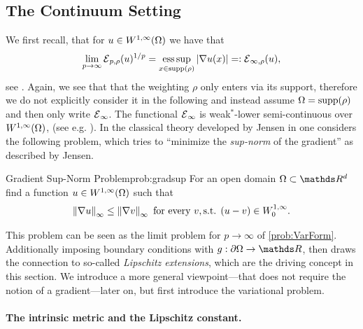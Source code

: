 \subsection{The Continuum Setting}\label{sec:LipExtCont}
%
%
We first recall, that for 
$u\in W^{1,\infty}(\Omega)$ we have that
%
\begin{align*}
\lim_{p\to\infty} \mathcal{E}{}_{p,\rho}(u)^{1/p} = \operatorname*{ess\,sup}_{x\in\mathrm{supp}(\rho)} \left|\nabla u(x)\right| =: \mathcal{E}{}_{\infty,\rho}(u),
\end{align*}
%
see \cite{jensen1993uniqueness}. Again, we see that that the weighting $\rho$ only enters via its support, therefore we do not explicitly consider it in the following and instead assume $\Omega=\mathrm{supp}(\rho)$ and then only write $\mathcal{E}{}_{\infty}$. The functional $\mathcal{E}{}_\infty$ is weak$^*$-lower semi-continuous over $W^{1,\infty}(\Omega)$, (see e.g. \cite[Thm. 2.6]{barron2001lower}). In the classical theory developed by Jensen in \cite{jensen1993uniqueness} one considers the following problem, which tries to \enquote{minimize the \emph{sup-norm} of the gradient} as described by Jensen.
%
\begin{problem}{Gradient Sup-Norm Problem}{prob:gradsup}
For an open domain $\domain\subset\R^d$ find a function $u\in W^{1,\infty}(\Omega)$ such that
%
\begin{align*}
\left\|\nabla u\right\|_\infty \leq \left\|\nabla v\right\|_\infty \text{ for every } v, \text{s.t. } (u-v)\in W^{1,\infty}_0.
\end{align*}
\end{problem}
%
\noindent%
This problem can be seen as the limit problem for $p\to\infty$ of \cref{prob:VarForm}. Additionally imposing boundary conditions with $g:\partial\domain\to\R$, \cite{jensen1993uniqueness} then draws the connection to so-called \emph{Lipschitz extensions}, which are the driving concept in this section. We introduce a more general viewpoint---that does not require the notion of a gradient---later on, but first introduce the variational problem. 

\paragraph{The intrinsic metric and the Lipschitz constant.}


